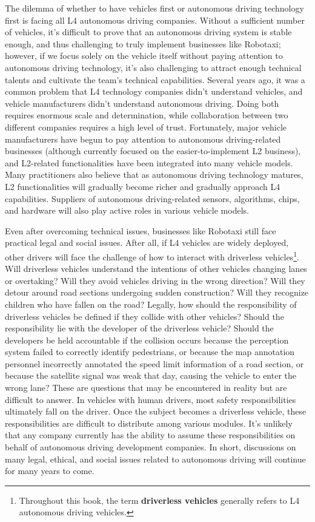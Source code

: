 The dilemma of whether to have vehicles first or autonomous driving technology first is facing all L4 autonomous driving companies. Without a sufficient number of vehicles, it's difficult to prove that an autonomous driving system is stable enough, and thus challenging to truly implement businesses like Robotaxi; however, if we focus solely on the vehicle itself without paying attention to autonomous driving technology, it's also challenging to attract enough technical talents and cultivate the team's technical capabilities. Several years ago, it was a common problem that L4 technology companies didn't understand vehicles, and vehicle manufacturers didn't understand autonomous driving. Doing both requires enormous scale and determination, while collaboration between two different companies requires a high level of trust. Fortunately, major vehicle manufacturers have begun to pay attention to autonomous driving-related businesses (although currently focused on the easier-to-implement L2 business), and L2-related functionalities have been integrated into many vehicle models. Many practitioners also believe that as autonomous driving technology matures, L2 functionalities will gradually become richer and gradually approach L4 capabilities. Suppliers of autonomous driving-related sensors, algorithms, chips, and hardware will also play active roles in various vehicle models.

Even after overcoming technical issues, businesses like Robotaxi still face practical legal and social issues. After all, if L4 vehicles are widely deployed, other drivers will face the challenge of how to interact with driverless vehicles\footnote{Throughout this book, the term \textbf{driverless vehicles} generally refers to L4 autonomous driving vehicles.}. Will driverless vehicles understand the intentions of other vehicles changing lanes or overtaking? Will they avoid vehicles driving in the wrong direction? Will they detour around road sections undergoing sudden construction? Will they recognize children who have fallen on the road? Legally, how should the responsibility of driverless vehicles be defined if they collide with other vehicles? Should the responsibility lie with the developer of the driverless vehicle? Should the developers be held accountable if the collision occurs because the perception system failed to correctly identify pedestrians, or because the map annotation personnel incorrectly annotated the speed limit information of a road section, or because the satellite signal was weak that day, causing the vehicle to enter the wrong lane? These are questions that may be encountered in reality but are difficult to answer. In vehicles with human drivers, most safety responsibilities ultimately fall on the driver. Once the subject becomes a driverless vehicle, these responsibilities are difficult to distribute among various modules. It's unlikely that any company currently has the ability to assume these responsibilities on behalf of autonomous driving development companies. In short, discussions on many legal, ethical, and social issues related to autonomous driving will continue for many years to come.

